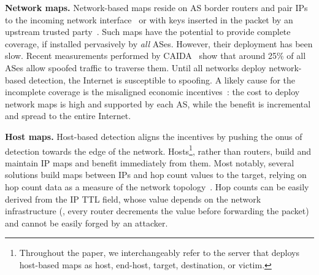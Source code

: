 \textbf{Network maps.}
Network-based maps reside on AS border routers and pair IPs to the incoming network interface~\citep{rpf,idpf} or with keys inserted in the packet by an upstream trusted party~\citep{spm}. Such maps have the potential to provide complete coverage, if installed pervasively by {\em all} ASes. However, their deployment has been slow. Recent measurements performed by CAIDA~\citep{spoofing-state} show that around 25\% of all ASes allow spoofed traffic to traverse them. Until all networks deploy network-based detection, the Internet is susceptible to spoofing.
%
A likely cause for the incomplete coverage is the misaligned economic incentives~\citep{pam17-loops}: the cost to deploy network maps is high and supported by each AS, while the benefit is incremental and spread to the entire Internet.


%



\textbf{Host maps.}
Host-based detection aligns the incentives by pushing the onus of detection towards the edge of the network. Hosts\footnote{Throughout the paper, we interchangeably refer to the server that deploys host-based maps as host, end-host, target, destination, or victim.}, rather than routers, build and maintain IP maps and benefit immediately from them. Most notably, several solutions build maps between IPs and hop count values to the target, relying on hop count data as a measure of the network topology~\citep{iphc,hcf}. 
Hop counts can be easily derived from the IP TTL field, whose value depends on the network infrastructure (\ie{}, every router decrements the value before forwarding the packet) and cannot be easily forged by an attacker.  

